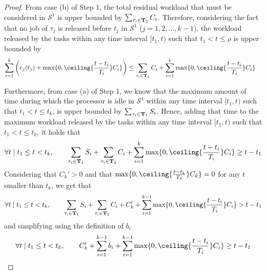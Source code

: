 \begin{proof}
From case (b) of Step 1, the total residual workload that must be considered in $\mathcal{S}^1$ is upper bounded by $\sum_{\tau_i \in {\bf T}_2} C_i$.
Therefore, considering the fact that no job of $\tau_j$ is released before $t_j$ in $\mathcal{S}^1$ ($j=1,2,\ldots,k-1$), the workload released by the tasks within any time interval $[t_1, t)$ such that $t_1 < t \leq \rho$ is upper bounded by 
\begin{align*}
\sum_{i=1}^k \left( c_j(t_j) + \max\{0, \ceiling{\frac{t- t_i}{T_i} } C_i \} \right) & \leq \sum_{\tau_i \in {\bf T}_2} C_i + \sum_{i=1}^k \max\{0, \ceiling{\frac{t- t_i}{T_i} } C_i \}
\end{align*}

Furthermore, from case (a) of Step 1, we know that the maximum amount of time during which the processor is idle in $\mathcal{S}^1$ within any time interval $[t_1, t)$ such that $t_1 < t \leq t_k$, is upper bounded by $\sum_{\tau_i \in {\bf T}_1} S_i$. %
Hence, adding that time to the maximum workload released by the tasks within any time interval $[t_1, t)$ such that $t_1 < t \leq t_k$, it holds that
\[
\forall t \mid t_1 \leq t < t_k,\qquad  \sum_{\tau_i \in {\bf T}_1} S_i + \sum_{\tau_i \in {\bf T}_2} C_i + \sum_{i=1}^{k} \max\{ 0, \ceiling{\frac{t- t_i}{T_i} } C_i\}  \geq t-t_1
\]
Considering that $C_k' > 0$ and that $\max\{ 0, \ceiling{\frac{t- t_k}{T_k} } C_k\} = 0$ for any $t$ smaller than $t_k$, we get that
\[
\forall t \mid t_1 \leq t < t_k,\qquad  \sum_{\tau_i \in {\bf T}_1} S_i + \sum_{\tau_i \in {\bf T}_2} C_i + C_k' + \sum_{i=1}^{k-1} \max\{ 0, \ceiling{\frac{t- t_i}{T_i} } C_i\}  > t-t_1
\]
and simplifying using the definition of $b_i$
\begin{equation}
\label{eq:eq1_in_proof}
\forall t \mid t_1 \leq t < t_k,\qquad  C_k'+\sum_{i=1}^{k-1} b_i + \sum_{i=1}^{k-1} \max\{ 0, \ceiling{\frac{t- t_i}{T_i} } C_i\} \geq t-t_1
\end{equation}


\end{proof}
